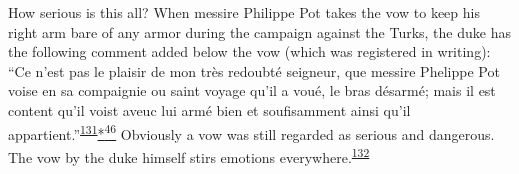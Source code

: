 How serious is this all? When messire Philippe Pot takes the vow to keep
his right arm bare of any armor during the campaign against the Turks,
the duke has the following comment added below the vow (which was
registered in writing): ``Ce n'est pas le plaisir de mon très redoubté
seigneur, que messire Phelippe Pot voise en sa compaignie ou saint
voyage qu'il a voué, le bras désarmé; mais il est content qu'il voist
aveuc lui armé bien et soufisamment ainsi qu'il
appartient.''\textsuperscript{\protect\hypertarget{10_Chapter_Three__THE_HEROIC_DREAM.xhtmlux5cux23id_1673}{\protect\hyperlink{23_NOTES.xhtmlux5cux23id_1674}{131}}}\protect\hypertarget{10_Chapter_Three__THE_HEROIC_DREAM.xhtmlux5cux23id_2879}{\protect\hyperlink{23_NOTES.xhtmlux5cux23id_2880}{*\textsuperscript{46}}}
Obviously a vow was still regarded as serious and dangerous. The vow by
the duke himself stirs emotions
everywhere.\textsuperscript{\protect\hypertarget{10_Chapter_Three__THE_HEROIC_DREAM.xhtmlux5cux23id_1671}{\protect\hyperlink{23_NOTES.xhtmlux5cux23id_1672}{132}}}

